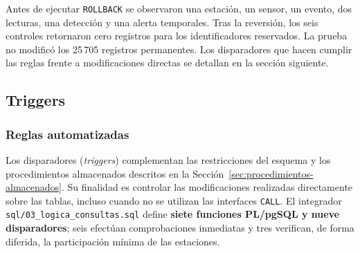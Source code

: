 \documentclass[12pt,a4paper]{article}
\begin{document}
Antes de ejecutar \texttt{ROLLBACK} se observaron una estación, un
sensor, un evento, dos lecturas, una detección y una alerta temporales.
Tras la reversión, los seis controles retornaron cero registros para
los identificadores reservados. La prueba no modificó los 25\,705
registros permanentes. Los disparadores que hacen cumplir las reglas
frente a modificaciones directas se detallan en la sección siguiente.



\subsection{Triggers}
\label{sec:triggers}

\subsubsection*{Reglas automatizadas}

Los disparadores (\emph{triggers}) complementan las restricciones del
esquema y los procedimientos almacenados descritos en la
Sección~\ref{sec:procedimientos-almacenados}. Su finalidad es controlar
las modificaciones realizadas directamente sobre las tablas, incluso
cuando no se utilizan las interfaces \texttt{CALL}. El integrador
\nolinkurl{sql/03_logica_consultas.sql} define \textbf{siete funciones
PL/pgSQL y nueve disparadores}; seis efectúan comprobaciones
inmediatas y tres verifican, de forma diferida, la participación
mínima de las estaciones.
\end{document}
